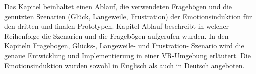 


Das Kapitel beinhaltet einen Ablauf, die verwendeten Frageb{\"o}gen und die genutzten Szenarien (Gl{\"u}ck, Langeweile, Frustration) der Emotionsinduktion f{\"u}r den dritten und finalen Prototypen. 
Kapitel Ablauf beschreibt in welcher Reihenfolge die Szenarien und die Frageb{\"o}gen aufgerufen wurden. 
In den Kapiteln Fragebogen, Gl{\"u}cks-, Langeweile- und Frustration- Szenario wird  die genaue Entwicklung und Implementierung in einer VR-Umgebung erl{\"a}utert.
Die Emotionsinduktion wurden sowohl in Englisch als auch in Deutsch angeboten.








